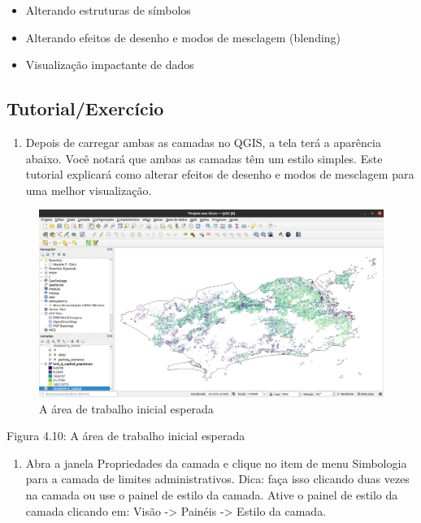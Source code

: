 \documentclass[
]{krantz}
\providecommand{\tightlist}{%
  \setlength{\itemsep}{0pt}\setlength{\parskip}{0pt}}
\begin{document}
\begin{itemize}
\tightlist
\item
  Alterando estruturas de símbolos
\item
  Alterando efeitos de desenho e modos de mesclagem (blending)
\item
  Visualização impactante de dados
\end{itemize}

\hypertarget{tutorialexercuxedcio}{%
\subsection{Tutorial/Exercício}\label{tutorialexercuxedcio}}

\begin{enumerate}
\def\labelenumi{\arabic{enumi}.}
\tightlist
\item
  Depois de carregar ambas as camadas no QGIS, a tela terá a aparência abaixo. Você notará que ambas as camadas têm um estilo simples. Este tutorial explicará como alterar efeitos de desenho e modos de mesclagem para uma melhor visualização.
\end{enumerate}

\begin{figure}
\centering
\includegraphics{media/modulo4/initial-workspace.png}
\caption{A área de trabalho inicial esperada}
\end{figure}

Figura 4.10: A área de trabalho inicial esperada

\begin{enumerate}
\def\labelenumi{\arabic{enumi}.}
\setcounter{enumi}{1}
\tightlist
\item
  Abra a janela Propriedades da camada e clique no item de menu Simbologia para a camada de limites administrativos. Dica: faça isso clicando duas vezes na camada ou use o painel de estilo da camada. Ative o painel de estilo da camada clicando em: Visão -\textgreater{} Painéis -\textgreater{} Estilo da camada.
\end{enumerate}
\end{document}
